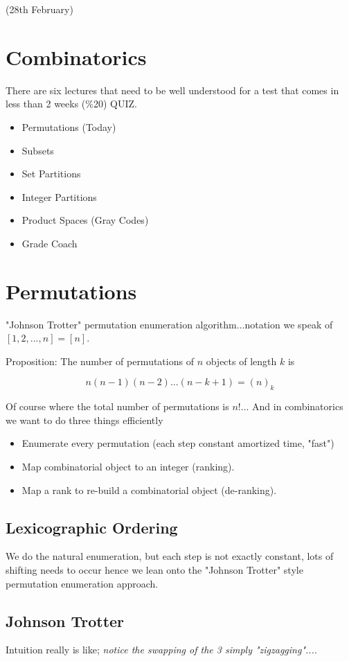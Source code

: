 \documentclass{article}
\begin{document}
(28th February)
\section*{Combinatorics}
There are six lectures that need to be well understood for a test that comes in less than 2 weeks (\%20) QUIZ.

\begin{itemize}
				\item Permutations (Today)
				\item Subsets
				\item Set Partitions
				\item Integer Partitions
				\item Product Spaces (Gray Codes)
				\item Grade Coach
\end{itemize}

\section*{Permutations}
"Johnson Trotter" permutation enumeration algorithm...notation we speak of $[1, 2, ..., n] = [n]$.

Proposition: The number of permutations of $n$ objects of length $k$ is

\begin{equation}
				n(n-1)(n-2)...(n-k+1) = (n)_k
\end{equation}

Of course where the total number of permutations is $n!$...
And in combinatorics we want to do three things efficiently

\begin{itemize}
				\item Enumerate every permutation (each step constant amortized time, "fast")
				\item Map combinatorial object to an integer (ranking).
				\item Map a rank to re-build a combinatorial object (de-ranking).
\end{itemize}

\subsection*{Lexicographic Ordering}
We do the natural enumeration, but each step is not exactly constant, lots of shifting needs to occur hence we lean onto the "Johnson Trotter" style permutation enumeration approach.

\subsection*{Johnson Trotter}
Intuition really is like; {\em notice the swapping of the 3 simply "zigzagging"...}.
\end{document}
